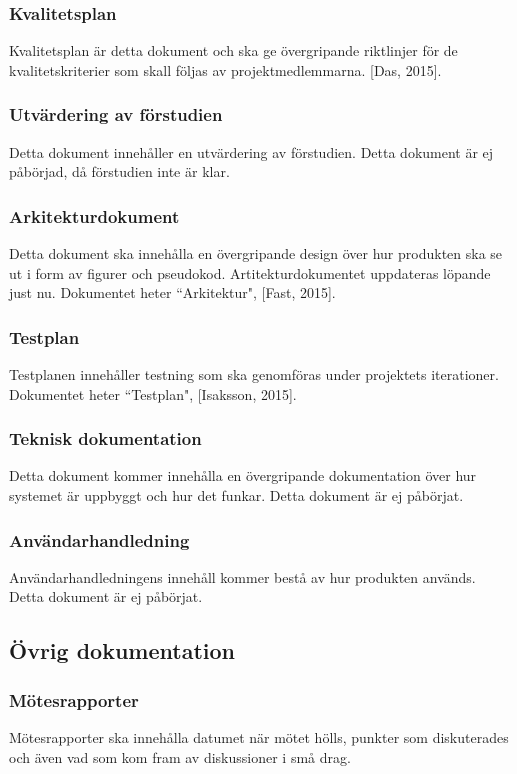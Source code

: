 \subsubsection{Kvalitetsplan}
Kvalitetsplan är detta dokument och ska ge övergripande riktlinjer för de kvalitetskriterier som skall följas av projektmedlemmarna. [Das, 2015].

\subsubsection{Utvärdering av förstudien}
Detta dokument innehåller en utvärdering av förstudien. Detta dokument är ej påbörjad, då förstudien inte är klar. 

\subsubsection{Arkitekturdokument}
Detta dokument ska innehålla en övergripande design över hur produkten ska se ut i form av figurer och pseudokod. Artitekturdokumentet uppdateras löpande just nu. Dokumentet heter ``Arkitektur", [Fast, 2015].

\subsubsection{Testplan}
Testplanen innehåller testning som ska genomföras under projektets iterationer. Dokumentet heter ``Testplan", [Isaksson, 2015].

\subsubsection{Teknisk dokumentation}
Detta dokument kommer innehålla en övergripande dokumentation över hur systemet är uppbyggt och hur det funkar. Detta dokument är ej påbörjat. 

\subsubsection{Användarhandledning}
Användarhandledningens innehåll kommer bestå av hur produkten används. Detta dokument är ej påbörjat.

\subsection{Övrig dokumentation}

\subsubsection{Mötesrapporter}
Mötesrapporter ska innehålla datumet när mötet hölls, punkter som diskuterades och även vad som kom fram av diskussioner i små drag.

